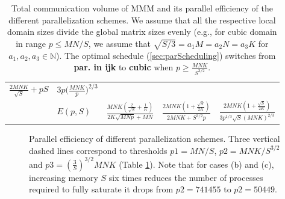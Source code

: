 \documentclass[sigplan,review,anonymous]{acmart}\settopmatter{printfolios=true,printccs=false,printacmref=false}
\begin{document}
\begin{table}[t]
\begin{tabular}{lllll}
    $\frac{2MNK}{\sqrt{S}} + pS$ & 
    $3p\big(\frac{MNK}{p}\big)^{2/3}$ 
    \\
    \cline{2-5}
    & $E(p,S)$ & $\frac{MNK(\frac{2}{\sqrt{S}} + 
    \frac{1}{K})}{2K\sqrt{MNp} 
      + MN}$ & $\frac{2MNK(1 + \frac{\sqrt{S}}{2K})}{2MNK + 
      S^{3/2}p}$ &   
    $\frac{2MNK(1 + 
    \frac{\sqrt{S}}{2K})}{3p^{1/3}\sqrt{S}(MNK)^{2/3}}$ \\
  \end{tabular}
  \caption{Total communication volume of MMM and its parallel 
  efficiency of 
  the 
  different parallelization schemes. We assume that all the 
  respective local 
  domain sizes divide the global matrix sizes evenly (e.g., for 
  cubic domain 
  in range $p \le MN/S$, we assume that $\sqrt{S/3} = a_1M = a_2N = 
  a_3K$ for 
  $a_1, a_2, a_3 \in \mathbb{N}$). The optimal schedule 
  (\cref{sec:parScheduling}) switches from \textbf{par. in ijk} to 
  \textbf{cubic} when $p \ge \frac{MNK}{S^{3/2}}$.}
  \label{tab:mmmEfficiency}
\end{table}


 \begin{figure}[t]
     \centering
   \hspace{-1cm}
   \hspace*{-1.5cm}
   \caption{Parallel 
   efficiency 
   of different parallelization schemes. Three vertical dashed lines 
   correspond to 
     thresholds 
     $p1 = MN/S$, $p2 = MNK/S^{3/2}$ and $p3 = 
     (\frac{3}{S})^{3/2}MNK$ (Table \ref{tab:mmmEfficiency}). Note 
     that for cases (b) and (c), increasing memory $S$ six times 
     reduces the number of processes required to fully saturate it 
     drops from $p2=741455$ to $p2=50449$. }
   \label{fig:mmmScaling}
 \end{figure}
\end{document}
